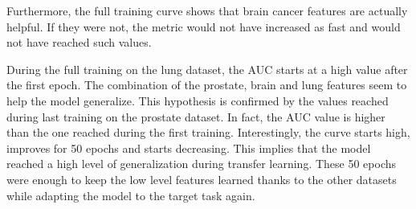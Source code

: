 Furthermore, the full training curve shows that brain cancer features are actually helpful. If they were not, the metric would not have increased as fast and would not have reached such values.

During the full training on the lung dataset, the AUC starts at a high value after the first epoch. The combination of the prostate, brain and lung features seem to help the model generalize. This hypothesis is confirmed by the values reached during last training on the prostate dataset. In fact, the AUC value is higher than the one reached during the first training. Interestingly, the curve starts high, improves for 50 epochs and starts decreasing. This implies that the model reached a high level of generalization during transfer learning. These 50 epochs were enough to keep the low level features learned thanks to the other datasets while adapting the model to the target task again. 


%
%


